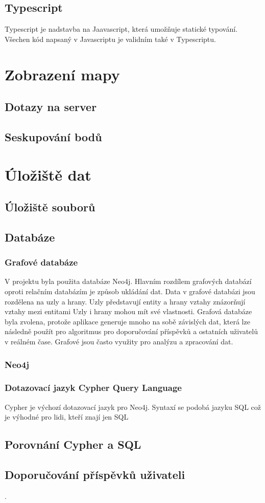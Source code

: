\documentclass[12pt, a4paper,
 twoside,        %
 openright
]{report}
\begin{document}
\subsection{Typescript}
Typescript je nadstavba na Jaavascript, která umožňuje statické typování. Všechen kód napsaný v Javascriptu je validním také v Typescriptu. 


\section{Zobrazení mapy}
\subsection{Dotazy na server}
\subsection{Seskupování bodů}

\section{Úložiště dat}
\subsection{Úložiště souborů}
\subsection{Databáze}
\subsubsection{Grafové databáze}
V projektu byla použita databáze Neo4j. Hlavním rozdílem grafových databází oproti relačním databázím je způsob ukládání dat. 
Data v grafové databázi jsou rozdělena na uzly a hrany. Uzly představují entity a hrany vztahy znázorňují vztahy mezi entitami
Uzly i hrany mohou mít své vlastnosti. Grafová databáze byla zvolena, protože aplikace generuje mnoho na sobě závislých dat, která
lze následně použít pro algoritmus pro doporučování příspěvků a ostatních uživatelů v reálném čase. Grafové jsou často využity pro
analýzu a zpracování dat.
\subsubsection{Neo4j}
\subsubsection{Dotazovací jazyk Cypher Query Language}
Cypher je výchozí dotazovací jazyk pro Neo4j. Syntaxí se podobá jazyku SQL což je výhodné pro lidi, kteří znají jen SQL
\subsection{Porovnání Cypher a SQL}
\subsection{Doporučování příspěvků uživateli}.

% 




 
\end{document}
